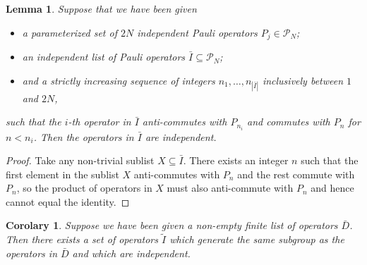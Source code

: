 \documentclass[twocolumn,showpacs,preprintnumbers,amsmath,amssymb,nofootinbib,pra,floatfix]{revtex4}
\newtheorem{lemma}{Lemma}
\newtheorem{corolary}{Corolary}
\newcommand{\lst}{\bar}
\newcommand{\set}{\tilde}
\begin{document}
\begin{lemma}
\label{result-is-independent}
Suppose that we have been given
\begin{itemize}
\item a parameterized set of $2N$ independent Pauli operators $P_j\in\mathscr{P}_N$;
\item an \emph{independent} list of Pauli operators $\lst I\subseteq \mathscr{P}_N$;
\item and a strictly increasing sequence of integers $n_1,\dots, n_{|\lst I|}$ inclusively between $1$ and $2N$,
\end{itemize}
such that the $i$-th operator in $\lst I$ anti-commutes with $P_{n_i}$ and commutes with $P_n$ for $n< n_i$.  Then the operators in $\lst I$ are independent.
\end{lemma}

\begin{proof}
Take any non-trivial sublist $X\subseteq \lst I$.  There exists an integer $n$ such that the first element in the sublist $X$ anti-commutes with $P_n$ and the rest commute with $P_n$, so the product of operators in $X$ must also anti-commute with $P_n$ and hence cannot equal the identity.
\end{proof}

\begin{corolary}
\label{corolary-make-independent}
Suppose we have been given a non-empty finite list of operators $\lst D$.  Then there exists a set of operators $\set I$ which generate the same subgroup as the operators in $\lst D$ and which are independent.
\end{corolary}
\end{document}
